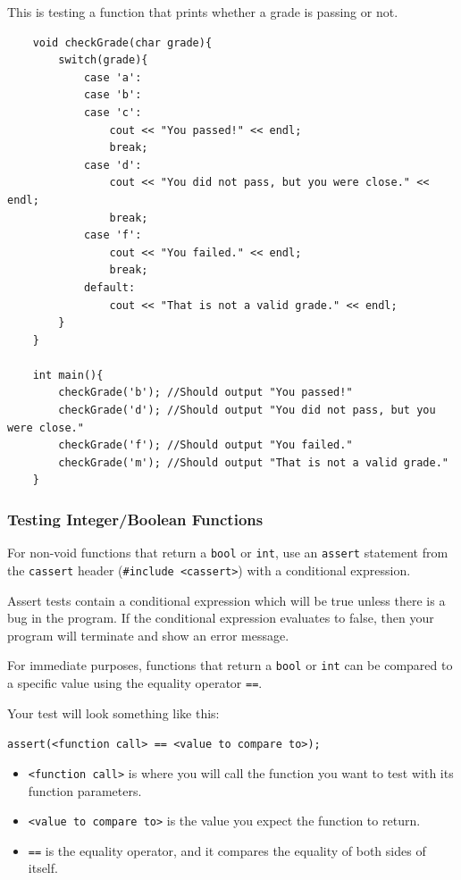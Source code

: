 \begin{example}
    This is testing a function that prints whether a grade is passing or not. 
    \begin{verbatim}
    void checkGrade(char grade){
        switch(grade){
            case 'a':
            case 'b':
            case 'c':
                cout << "You passed!" << endl;
                break;
            case 'd':
                cout << "You did not pass, but you were close." << endl;
                break;
            case 'f':
                cout << "You failed." << endl;
                break;
            default:
                cout << "That is not a valid grade." << endl;
        }
    }        

    int main(){
        checkGrade('b'); //Should output "You passed!"
        checkGrade('d'); //Should output "You did not pass, but you were close."
        checkGrade('f'); //Should output "You failed."
        checkGrade('m'); //Should output "That is not a valid grade."
    }
    \end{verbatim}

\end{example}

\subsubsection{Testing Integer/Boolean Functions}

For non-void functions that return a \texttt{bool} or \texttt{int}, use an \texttt{assert} statement from the \texttt{cassert} header (\texttt{#include <cassert>}) with a conditional expression.

Assert tests contain a conditional expression which will be true unless there is a bug in the program. If the conditional expression evaluates to false, then your program will terminate and show an error message.

For immediate purposes, functions that return a \texttt{bool} or \texttt{int} can be compared to a specific value using the equality operator \texttt{==}.

Your test will look something like this:

\texttt{assert(<function call> == <value to compare to>);}

\begin{itemize}
    \item \texttt{<function call>} is where you will call the function you want to test with its function parameters.
    \item \texttt{<value to compare to>} is the value you expect the function to return.
    \item \texttt{==} is the equality operator, and it compares the equality of both sides of itself.
\end{itemize}

